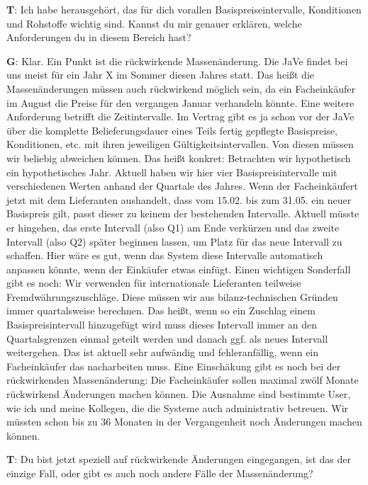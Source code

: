\begin{list}{X:}{\setlength{\labelsep}{5mm}}
 \item[\textbf{T}:] Ich habe herausgehört, das für dich vorallen Basispreiseintervalle, Konditionen und Rohstoffe wichtig sind. Kannst du mir genauer erklären, welche Anforderungen du in diesem Bereich hast?
 \item[\textbf{G}:] Klar. Ein Punkt ist die rückwirkende Massenänderung. Die JaVe findet bei uns meist für ein Jahr X im Sommer diesen Jahres statt. Das hei\ss t die Massenänderungen müssen auch rückwirkend möglich sein, da ein Facheinkäufer \zB im August die Preise für den vergangen Januar verhandeln könnte. Eine weitere Anforderung betrifft die Zeitintervalle. Im Vertrag gibt es ja schon vor der JaVe über die komplette Belieferungsdauer eines Teils fertig gepflegte Basispreise, Konditionen, etc. mit ihren jeweiligen Gültigkeitsintervallen. Von diesen müssen wir beliebig abweichen können. Das hei\ss t konkret: Betrachten wir hypothetisch ein hypothetisches Jahr. Aktuell haben wir hier vier Basispreisintervalle mit verschiedenen Werten anhand der Quartale des Jahres. Wenn der Facheinkäufert jetzt mit dem Lieferanten aushandelt, dass vom 15.02. bis zum 31.05. ein neuer Basispreis gilt, passt dieser zu keinem der bestehenden Intervalle. Aktuell müsste er hingehen, das erste Intervall (also Q1) am Ende verkürzen und das zweite Intervall (also Q2) später beginnen lassen, um Platz für das neue Intervall zu schaffen. Hier wäre es gut, wenn das System diese Intervalle automatisch anpassen könnte, wenn der Einkäufer etwas einfügt. Einen wichtigen Sonderfall gibt es noch: Wir verwenden für internationale Lieferanten teilweise Fremdwährungszuschläge. Diese müssen wir aus bilanz-technischen Gründen immer quartalsweise berechnen. Das hei\ss t, wenn so ein Zuschlag einem Basispreisintervall hinzugefügt wird muss dieses Intervall immer an den Quartalsgrenzen einmal geteilt werden und danach ggf. als neues Intervall weitergehen. Das ist aktuell sehr aufwändig und fehleranfällig, wenn ein Facheinkäufer das nacharbeiten muss. Eine Einschäkung gibt es noch bei der rückwirkenden Massenänderung: Die Facheinkäufer sollen maximal zwölf Monate rückwirkend Änderungen machen können. Die Ausnahme sind bestimmte User, wie ich und meine Kollegen, die die Systeme auch administrativ betreuen. Wir müssten schon bis zu 36 Monaten in der Vergangenheit noch Änderungen machen können.
 \item[\textbf{T}:] Du bist jetzt speziell auf rückwirkende Änderungen eingegangen, ist das der einzige Fall, oder gibt es auch noch andere Fälle der Massenänderung?

\end{list}
